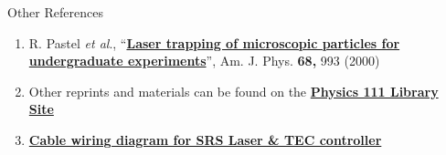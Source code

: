 \documentclass{../lab}
\begin{document}
Other References

\begin{enumerate}
    \item R. Pastel \emph{et al}., ``\href{http://physics111.lib.berkeley.edu/Physics111/Reprints/OTZ/Build-Optical-Trap-3.pdf}{\textbf{Laser trapping of microscopic particles for undergraduate experiments}}'', Am. J. Phys. \textbf{68,} 993 (2000)

    \item Other reprints and materials can be found on the \href{http://physics111.lib.berkeley.edu/Physics111/Reprints/OTZ/OTZ\_index.html}{\textbf{Physics 111 Library Site}}

    \item \href{http://experimentationlab.berkeley.edu/sites/default/files/images/Cable\_Diagram\_Laser\_TEC.pdf}{\textbf{Cable wiring diagram for SRS Laser \& TEC controller}}

\end{enumerate}
\end{document}
